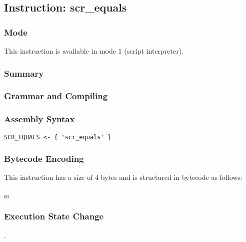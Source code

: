 \subsection{Instruction: scr\_equals}

\subsubsection{Mode}
This instruction is available in mode 1 (script interpreter).
\subsubsection{Summary}


\subsubsection{Grammar and Compiling}


\subsubsection{Assembly Syntax}

\begin{myquote}
\begin{verbatim}
SCR_EQUALS <- { 'scr_equals' }
\end{verbatim}
\end{myquote}

\subsubsection{Bytecode Encoding}

This instruction has a size of 4 bytes and is structured in bytecode as follows:

$_{00}$\ 

\subsubsection{Execution State Change}

.


